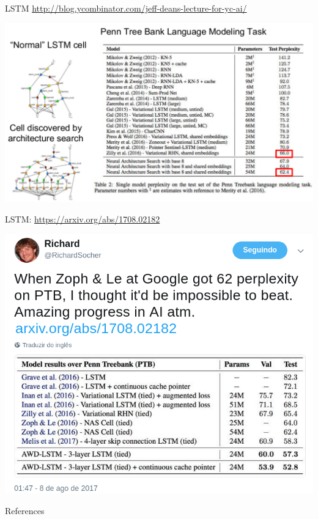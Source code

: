 \documentclass[10pt]{beamer}
\begin{document}
\begin{frame}{LSTM}
\url{http://blog.ycombinator.com/jeff-deans-lecture-for-yc-ai/}

\begin{center}
\includegraphics[scale=0.45]{images/JeffDeanLectureforYCAI.pdf}
\end{center}

\end{frame}


\begin{frame}{LSTM: \url{https://arxiv.org/abs/1708.02182}}

\begin{center}
\includegraphics[scale=0.34]{images/SocherPTB.png}
\end{center}

\end{frame}


\begin{frame}[allowframebreaks]{References}

  
  

\end{frame}
\end{document}
